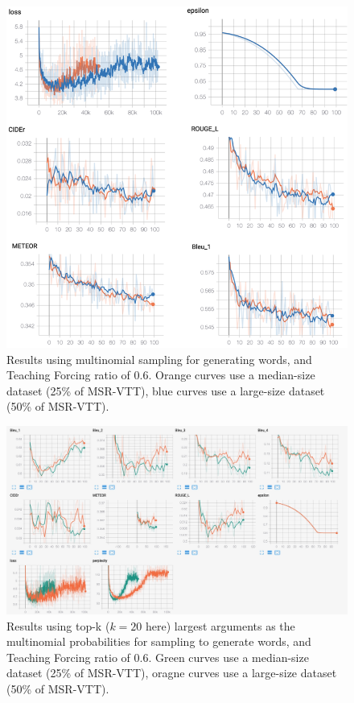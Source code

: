 \documentclass[11pt,a4paper]{article}
\begin{document}
\begin{figure}
    \centering
    \includegraphics[width=\linewidth]{result_large.png}
    \caption{Results using multinomial sampling for generating words, and Teaching Forcing ratio of 0.6. Orange curves use a median-size dataset (25\% of MSR-VTT), blue curves use a large-size dataset (50\% of MSR-VTT).}
    \label{fig:result_large}
\end{figure}

\begin{figure}
    \centering
    \includegraphics[width=\linewidth]{result_topk.jpg}
    \caption{Results using top-k ($k=20$ here) largest arguments as the multinomial probabilities for sampling to generate words, and Teaching Forcing ratio of 0.6. Green curves use a median-size dataset (25\% of MSR-VTT), oragne curves use a large-size dataset (50\% of MSR-VTT).}
    \label{fig:result_topk}
\end{figure}
\end{document}
